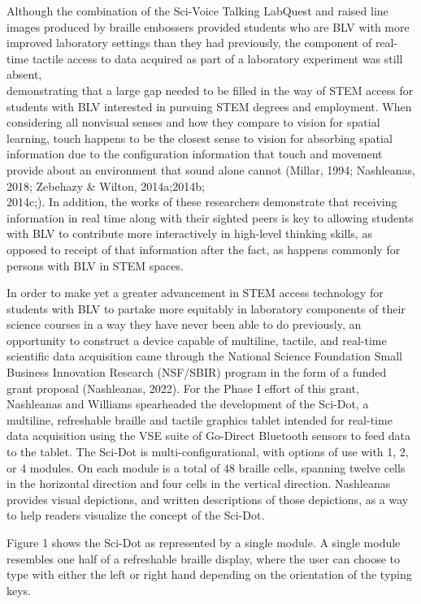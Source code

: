 \documentclass[11.5pt]{sig-alternate}
\begin{document}
\begin{large}
Although the combination of the Sci-Voice Talking LabQuest and raised line images produced by braille embossers provided students who are BLV with more improved laboratory settings than they had previously, the component of real-time tactile access to data acquired as part of a laboratory experiment was still absent, \\demonstrating that a large gap needed to be filled in the way of STEM access for students with BLV interested in pursuing STEM degrees and employment. When considering all nonvisual senses and how they compare to vision for spatial learning, touch happens to be the closest sense to vision for absorbing spatial information due to the configuration information that touch and movement provide about an environment that sound alone cannot (Millar, 1994; Nashleanas, 2018; Zebehazy \& Wilton, 2014a;2014b;\\2014c;). In addition, the works of these researchers demonstrate that receiving information in real time along with their sighted peers is key to allowing students with BLV to contribute more interactively in high-level thinking skills, as opposed to receipt of that information after the fact, as happens commonly for persons with BLV in STEM spaces.

In order to make yet a greater advancement in STEM access technology for students with BLV to partake more equitably in laboratory components of their science courses in a way they have never been able to do previously, an opportunity to construct a device capable of multiline, tactile, and real-time scientific data acquisition came through the National Science Foundation Small Business Innovation Research (NSF/SBIR) program in the form of a funded grant proposal (Nashleanas, 2022). For the Phase I effort of this grant, Nashleanas and Williams spearheaded the development of the Sci-Dot, a multiline, refreshable braille and tactile graphics tablet intended for real-time data acquisition using the VSE suite of Go-Direct Bluetooth sensors to feed data to the tablet. The Sci-Dot is multi-configurational, with options of use with 1, 2, or 4 modules. On each module is a total of 48 braille cells, spanning twelve cells in the horizontal direction and four cells in the vertical direction. Nashleanas provides visual depictions, and written descriptions of those depictions, as a way to help readers visualize the concept of the Sci-Dot.

Figure 1 shows the Sci-Dot as represented by a single module. A single module resembles one half of a refreshable braille display, where the user can choose to type with either the left or right hand depending on the orientation of the typing keys.


\end{large}
\end{document}
